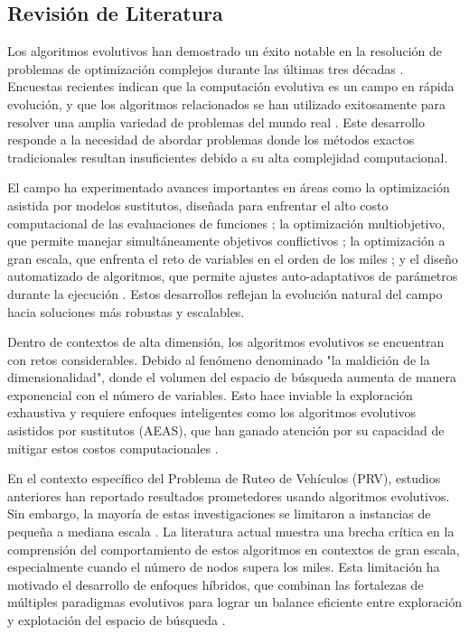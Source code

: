 \documentclass[10pt,a4paper]{article}
\begin{document}
\begin{multicols}{2}
\section{Revisión de Literatura}

Los algoritmos evolutivos han demostrado un éxito notable en la resolución de problemas de optimización complejos durante las últimas tres décadas \cite{fogel2006,back2013}. Encuestas recientes indican que la computación evolutiva es un campo en rápida evolución, y que los algoritmos relacionados se han utilizado exitosamente para resolver una amplia variedad de problemas del mundo real \cite{yang2013}. Este desarrollo responde a la necesidad de abordar problemas donde los métodos exactos tradicionales resultan insuficientes debido a su alta complejidad computacional.

El campo ha experimentado avances importantes en áreas como la optimización asistida por modelos sustitutos, diseñada para enfrentar el alto costo computacional de las evaluaciones de funciones \cite{jin2011}; la optimización multiobjetivo, que permite manejar simultáneamente objetivos conflictivos \cite{coello2007,zhang2008}; la optimización a gran escala, que enfrenta el reto de variables en el orden de los miles \cite{lozano2011}; y el diseño automatizado de algoritmos, que permite ajustes auto-adaptativos de parámetros durante la ejecución \cite{brest2006}. Estos desarrollos reflejan la evolución natural del campo hacia soluciones más robustas y escalables.

Dentro de contextos de alta dimensión, los algoritmos evolutivos se encuentran con retos considerables.
Debido al fenómeno denominado "la maldición de la dimensionalidad", donde el volumen del espacio de búsqueda aumenta de manera exponencial con el número de variables. Esto hace inviable la exploración exhaustiva y requiere enfoques inteligentes como los algoritmos evolutivos asistidos por sustitutos (AEAS), que han ganado atención por su capacidad de mitigar estos costos computacionales \cite{wang2018}.

En el contexto específico del Problema de Ruteo de Vehículos (PRV), estudios anteriores han reportado resultados prometedores usando algoritmos evolutivos. Sin embargo, la mayoría de estas investigaciones se limitaron a instancias de pequeña a mediana escala \cite{rego2011}. La literatura actual muestra una brecha crítica en la comprensión del comportamiento de estos algoritmos en contextos de gran escala, especialmente cuando el número de nodos supera los miles. Esta limitación ha motivado el desarrollo de enfoques híbridos, que combinan las fortalezas de múltiples paradigmas evolutivos para lograr un balance eficiente entre exploración y explotación del espacio de búsqueda \cite{potter2000}.



\end{multicols}
\end{document}
